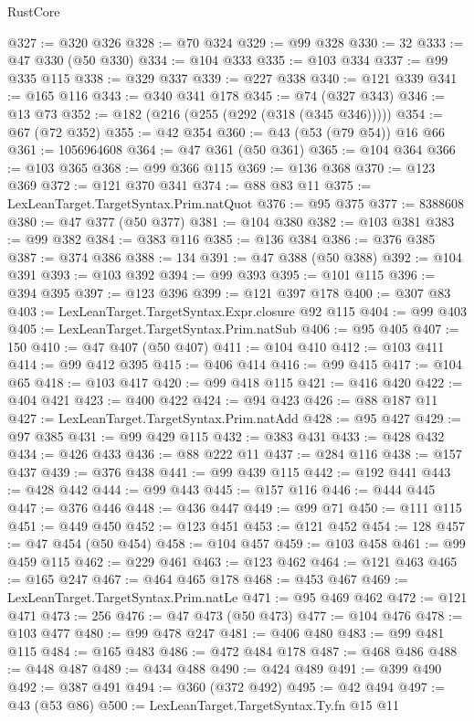 \begin{lexlean}{RustCore}
\begin{coremodule}
@327 := @320 @326
@328 := @70 @324
@329 := @99 @328
@330 := 32
@333 := @47 @330 (@50 @330)
@334 := @104 @333
@335 := @103 @334
@337 := @99 @335 @115
@338 := @329 @337
@339 := @227 @338
@340 := @121 @339
@341 := @165 @116
@343 := @340 @341 @178
@345 := @74 (@327 @343)
@346 := @13 @73
@352 := @182 (@216 (@255 (@292 (@318 (@345 @346)))))
@354 := @67 (@72 @352)
@355 := @42 @354
@360 := @43 (@53 (@79 @54)) @16 @66
@361 := 1056964608
@364 := @47 @361 (@50 @361)
@365 := @104 @364
@366 := @103 @365
@368 := @99 @366 @115
@369 := @136 @368
@370 := @123 @369
@372 := @121 @370 @341
@374 := @88 @83 @11
@375 := LexLeanTarget.TargetSyntax.Prim.natQuot
@376 := @95 @375
@377 := 8388608
@380 := @47 @377 (@50 @377)
@381 := @104 @380
@382 := @103 @381
@383 := @99 @382
@384 := @383 @116
@385 := @136 @384
@386 := @376 @385
@387 := @374 @386
@388 := 134
@391 := @47 @388 (@50 @388)
@392 := @104 @391
@393 := @103 @392
@394 := @99 @393
@395 := @101 @115
@396 := @394 @395
@397 := @123 @396
@399 := @121 @397 @178
@400 := @307 @83
@403 := LexLeanTarget.TargetSyntax.Expr.closure @92 @115
@404 := @99 @403
@405 := LexLeanTarget.TargetSyntax.Prim.natSub
@406 := @95 @405
@407 := 150
@410 := @47 @407 (@50 @407)
@411 := @104 @410
@412 := @103 @411
@414 := @99 @412 @395
@415 := @406 @414
@416 := @99 @415
@417 := @104 @65
@418 := @103 @417
@420 := @99 @418 @115
@421 := @416 @420
@422 := @404 @421
@423 := @400 @422
@424 := @94 @423
@426 := @88 @187 @11
@427 := LexLeanTarget.TargetSyntax.Prim.natAdd
@428 := @95 @427
@429 := @97 @385
@431 := @99 @429 @115
@432 := @383 @431
@433 := @428 @432
@434 := @426 @433
@436 := @88 @222 @11
@437 := @284 @116
@438 := @157 @437
@439 := @376 @438
@441 := @99 @439 @115
@442 := @192 @441
@443 := @428 @442
@444 := @99 @443
@445 := @157 @116
@446 := @444 @445
@447 := @376 @446
@448 := @436 @447
@449 := @99 @71
@450 := @111 @115
@451 := @449 @450
@452 := @123 @451
@453 := @121 @452
@454 := 128
@457 := @47 @454 (@50 @454)
@458 := @104 @457
@459 := @103 @458
@461 := @99 @459 @115
@462 := @229 @461
@463 := @123 @462
@464 := @121 @463
@465 := @165 @247
@467 := @464 @465 @178
@468 := @453 @467
@469 := LexLeanTarget.TargetSyntax.Prim.natLe
@471 := @95 @469 @462
@472 := @121 @471
@473 := 256
@476 := @47 @473 (@50 @473)
@477 := @104 @476
@478 := @103 @477
@480 := @99 @478 @247
@481 := @406 @480
@483 := @99 @481 @115
@484 := @165 @483
@486 := @472 @484 @178
@487 := @468 @486
@488 := @448 @487
@489 := @434 @488
@490 := @424 @489
@491 := @399 @490
@492 := @387 @491
@494 := @360 (@372 @492)
@495 := @42 @494
@497 := @43 (@53 @86)
@500 := LexLeanTarget.TargetSyntax.Ty.fn @15 @11

\end{coremodule}
\end{lexlean}

